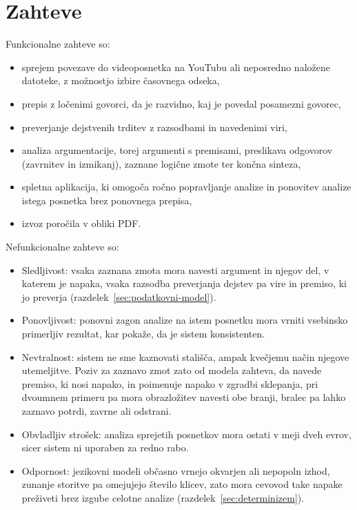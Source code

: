 \documentclass[a4paper, 12pt]{book}
\begin{document}
\section{Zahteve}
\label{sec:zahteve}

Funkcionalne zahteve so:

\begin{itemize}
\item sprejem povezave do videoposnetka na YouTubu ali neposredno naložene
datoteke, z možnostjo izbire časovnega odseka,
\item prepis z ločenimi govorci, da je razvidno, kaj je povedal posamezni
govorec,
\item preverjanje dejstvenih trditev z razsodbami in navedenimi viri,
\item analiza argumentacije, torej argumenti s premisami, preslikava odgovorov (zavrnitev
in izmikanj), zaznane logične zmote ter končna sinteza,
\item spletna aplikacija, ki omogoča ročno popravljanje analize in ponovitev
analize istega posnetka brez ponovnega prepisa,
\item izvoz poročila v obliki PDF.
\end{itemize}

Nefunkcionalne zahteve so:

\begin{itemize}
\item Sledljivost: vsaka zaznana zmota mora navesti argument in njegov
del, v katerem je napaka, vsaka razsodba preverjanja dejstev pa vire in premiso,
ki jo preverja (razdelek~\ref{sec:podatkovni-model}).
\item Ponovljivost: ponovni zagon analize na istem posnetku mora vrniti
vsebinsko primerljiv rezultat, kar pokaže, da je sistem konsistenten. 
\item Nevtralnost: sistem ne sme kaznovati stališča, ampak kvečjemu
način njegove utemeljitve. Poziv za zaznavo zmot zato od modela zahteva, da navede premiso, ki nosi napako, in poimenuje napako v zgradbi sklepanja, pri dvoumnem primeru pa mora obrazložitev navesti obe branji, bralec pa lahko zaznavo
potrdi, zavrne ali odstrani.
\item Obvladljiv strošek: analiza sprejetih posnetkov mora ostati v
meji dveh evrov, sicer sistem ni uporaben za redno rabo.
\item Odpornost: jezikovni modeli občasno vrnejo okvarjen ali nepopoln
izhod, zunanje storitve pa omejujejo število klicev, zato mora cevovod take
napake preživeti brez izgube celotne analize (razdelek~\ref{sec:determinizem}).
\end{itemize}
\end{document}
